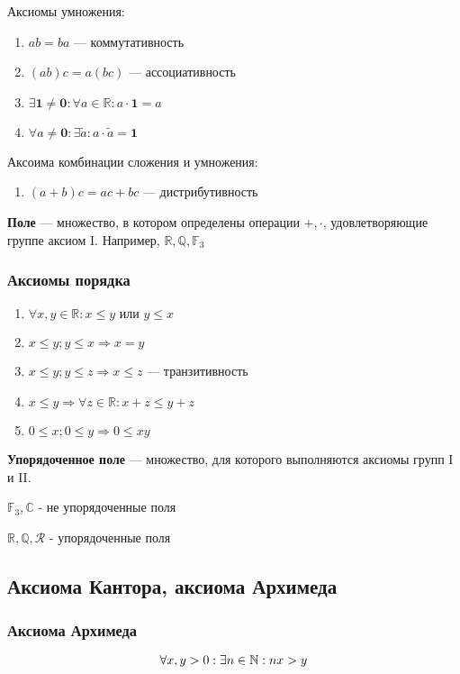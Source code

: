 Аксиомы умножения:
\begin{enumerate}
    \item $ab=ba$ --- коммутативность
    \item $(ab)c=a(bc)$ --- ассоциативность
    \item $\exists \bm 1\not =\bm 0: \forall a\in \mathbb{R}: a\cdot\bm 1=a$
    \item $\forall a\not =\bm 0: \exists \tilde{a}: a\cdot \tilde{a}=\bm 1$
\end{enumerate}

Аксоима комбинации сложения и умножения:
\begin{enumerate}
    \item $(a+b)c=ac+bc$ --- дистрибутивность
\end{enumerate}

\textbf{Поле} --- множество, в котором определены операции $+,\cdot$, удовлетворяющие группе аксиом I. Например, $\mathbb{R}, \mathbb{Q}, \mathbb{F}_3$

\subsubsection{Аксиомы порядка}
\begin{enumerate}
    \item $\forall x,y \in \mathbb{R}: x\leq y \text{ или } y\leq x$
    \item $x\leq y; y\leq x \Rightarrow x=y$
    \item $x\leq y; y\leq z \Rightarrow x\leq z$ --- транзитивность
    \item $x\leq y \Rightarrow \forall z\in \mathbb{R}: x+z\leq y+z$
    \item $0\leq x; 0\leq y \Rightarrow 0\leq xy$
\end{enumerate}

\textbf{Упорядоченное поле} --- множество, для которого выполняются аксиомы групп I и II.

$\mathbb{F}_3, \mathbb{C}$ - не упорядоченные поля

$\mathbb{R}, \mathbb{Q}, \mathcal{R}$ - упорядоченные поля

\subsection{Аксиома Кантора, аксиома Архимеда}
\subsubsection{Аксиома Архимеда}
$$\forall x,y>0: \exists n\in \operatorname*{\mathbb{N}}: nx>y$$

